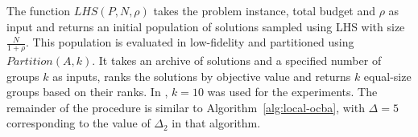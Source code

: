 The function $LHS(P,N,\rho)$ takes the problem instance, total budget and $\rho$ as input and returns an initial population of solutions sampled using LHS with size $\frac{N}{1+\rho}$. This population is evaluated in low-fidelity and partitioned using $Partition(A,k)$. It takes an archive of solutions and a specified number of groups $k$ as inputs, ranks the solutions by objective value and returns $k$ equal-size groups based on their ranks. In \cite{xu2016mo2tos}, $k=10$ was used for the experiments. The remainder of the procedure is similar to Algorithm~\ref{alg:local-ocba}, with $\Delta = 5$ corresponding to the value of $\Delta_2$ in that algorithm.
